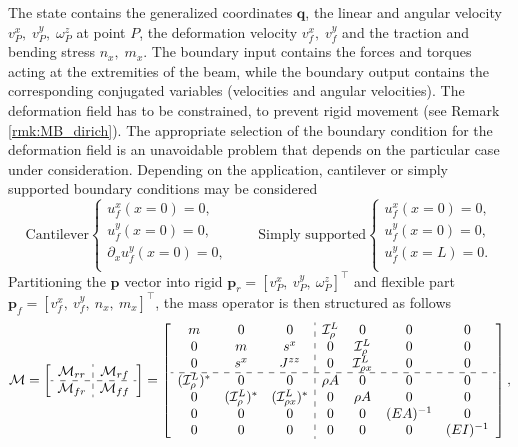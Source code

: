 The state contains the generalized coordinates $\bm{q}$, the linear and angular velocity $v_P^x, \; v_P^y, \; \omega_P^z$ at point $P$, the deformation velocity $ v_f^x, \; v_f^y$ and the traction and bending stress $n_x, \; m_{x}$. The boundary input contains the forces and torques acting at the extremities of the beam, while the boundary output contains the corresponding conjugated variables (velocities and angular velocities).
The deformation field has to be constrained, to prevent rigid movement (see Remark \ref{rmk:MB_dirich}). The appropriate selection of the boundary condition for the deformation field is an unavoidable problem that depends on the particular case under consideration.  Depending on the application, cantilever or simply supported boundary conditions may be considered
\begin{equation*}
\text{Cantilever}
\begin{cases}
u_f^x(x=0) = 0, \\
u_f^y(x=0) = 0, \\
\partial_x u_f^y(x=0) = 0, \\
\end{cases} \qquad 
\text{Simply supported}
\begin{cases}
u_f^x(x=0) = 0, \\
u_f^y(x=0) = 0, \\
u_f^y(x=L) = 0. \\
\end{cases}
\end{equation*}
Partitioning the $\bm{p}$ vector into rigid $\bm{p}_r = [v_P^x, \ v_P^y, \ \omega_P^z]^\top$ and flexible part $\bm{p}_f = [v_f^x, \ v_f^y, \ n_x, \ m_{x}]^\top$, the mass operator is then structured as follows
\begin{equation}
\label{eq:EB_M}
{\mathcal{M}} = 
\left[ \begin{array}{c:c}
{\mathcal{M}}_{rr} & {\mathcal{M}}_{rf} \\
\hdashline
{\mathcal{M}}_{fr} & {\mathcal{M}}_{ff} \\
\end{array} \right] = 
\left[ \begin{array}{ccc:cccc}
m & 0 & 0 & \mathcal{I}_\rho^L & 0 & 0 & 0 \\
0 & m & s^x & 0 & \mathcal{I}_\rho^L & 0 & 0 \\
0 & s^x & J^{zz} & 0 & \mathcal{I}_{\rho x}^{L} & 0 & 0 \\
\hdashline 
(\mathcal{I}_\rho^{L})^* & 0 & 0 & \rho A & 0 & 0 & 0  \\
0 & (\mathcal{I}_\rho^{L})^* & (\mathcal{I}_{\rho x}^{L})^* & 0 & \rho A & 0 & 0  \\
0 & 0 & 0 & 0 & 0 & (EA)^{-1} & 0 \\
0 & 0 & 0 & 0 & 0 & 0 & (EI)^{-1} \\
\end{array} \right],
\end{equation}
